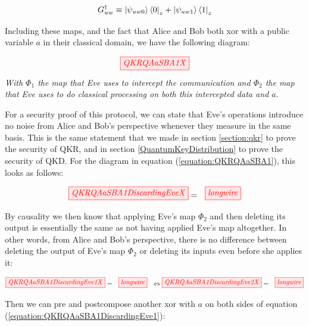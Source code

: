 \documentclass[]{article}
\begin{document}
\begin{equation}
G_{uw}^\dagger \equiv \ket{\psi_{uw0}}\bra{0}_z + \ket{\psi_{uw1}}\bra{1}_z
\end{equation}

Including these maps, and the fact that Alice and Bob both xor with a public variable $a$ in their classical domain, we have the following diagram:

\begin{equation}
	\label{equation:QKRQAaSBA1}
	\tikzfig{QKRQAaSBA1X}
\end{equation}
\textit{With $\Phi_1$ the map that Eve uses to intercept the communication and $\Phi_2$ the map that Eve uses to do classical processing on both this intercepted data and $a$.}

For a security proof of this protocol, we can state that Eve's operations introduce no noise from Alice and Bob's perspective whenever they measure in the same basis. This is the same statement that we made in section \ref{section:qkr} to prove the security of QKR, and in section \ref{QuantumKeyDistribution} to prove the security of QKD. For the diagram in equation (\ref{equation:QKRQAaSBA1}), this looks as follows:

\begin{equation}
\label{equation:QAaSBProofSetupReal}
\tikzfig{QKRQAaSBA1DiscardingEveX} = ~~ \tikzfig{longwire}
\end{equation}

By causality we then know that applying Eve's map $\Phi_2$ and then deleting its output is essentially the same as not having applied Eve's map altogether. In other words, from Alice and Bob's perspective, there is no difference between deleting the output of Eve's map $\Phi_2$ or deleting its inputs even before she applies it:

\begin{equation}
\label{equation:QKRQAaSBA1DiscardingEve1}
\tikzfig{QKRQAaSBA1DiscardingEve1X} = ~~ \tikzfig{longwire}
~~\Leftrightarrow
\tikzfig{QKRQAaSBA1DiscardingEve2X} = ~~ \tikzfig{longwire}
\end{equation}

Then we can pre and postcompose another xor with $a$ on both sides of equation (\ref{equation:QKRQAaSBA1DiscardingEve1}):
\end{document}
